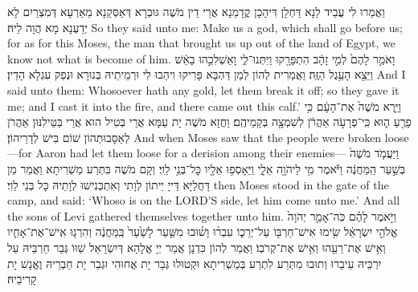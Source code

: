 {{וַאֲמַרוּ לִי עֲבֵיד לַנָא דַּחְלָן דִּיהָכָן קֳדָמַנָא אֲרֵי דֵין מֹשֶׁה גּוּבְרָא דְּאַסְּקַנָא מֵאַרְעָא דְּמִצְרַיִם לָא יְדַעְנָא מָא הֲוָה לֵיהּ׃}
{So they said unto me: Make us a god, which shall go before us; for as for this Moses, the man that brought us up out of the land of Egypt, we know not what is become of him.}{}
{וָאֹמַ֤ר לָהֶם֙ לְמִ֣י זָהָ֔ב הִתְפָּרָ֖קוּ וַיִּתְּנוּ־לִ֑י וָאַשְׁלִכֵ֣הוּ בָאֵ֔שׁ וַיֵּצֵ֖א הָעֵ֥גֶל הַזֶּֽה׃
}
{וַאֲמַרִית לְהוֹן לְמַן דַּהְבָּא פָּרִיקוּ וִיהַבוּ לִי וּרְמֵיתֵיהּ בְּנוּרָא וּנְפַק עִגְלָא הָדֵין׃}
{And I said unto them: Whosoever hath any gold, let them break it off; so they gave it me; and I cast it into the fire, and there came out this calf.’}{}
{וַיַּ֤רְא מֹשֶׁה֙ אֶת־הָעָ֔ם כִּ֥י פָרֻ֖עַ ה֑וּא כִּֽי־פְרָעֹ֣ה אַהֲרֹ֔ן לְשִׁמְצָ֖ה בְּקָמֵיהֶֽם׃
}
{וַחֲזָא מֹשֶׁה יָת עַמָּא אֲרֵי בְּטִיל הוּא אֲרֵי בַּטֵּילִנּוּן אַהֲרֹן לְאַסָּבוּתְהוֹן שׁוֹם בִּישׁ לְדָרֵיהוֹן׃}
{And when Moses saw that the people were broken loose—for Aaron had let them loose for a derision among their enemies—}{}
{וַיַּעֲמֹ֤ד מֹשֶׁה֙ בְּשַׁ֣עַר הַֽמַּחֲנֶ֔ה וַיֹּ֕אמֶר מִ֥י לַיהֹוָ֖ה אֵלָ֑י וַיֵּאָסְפ֥וּ אֵלָ֖יו כׇּל־בְּנֵ֥י לֵוִֽי׃
}
{וְקָם מֹשֶׁה בִּתְרַע מַשְׁרִיתָא וַאֲמַר מַן דָּחֲלַיָּא דַּייָ יֵיתוֹן לְוָתִי וְאִתְכְּנִישׁוּ לְוָתֵיהּ כָּל בְּנֵי לֵוִי׃}
{then Moses stood in the gate of the camp, and said: ‘Whoso is on the LORD’S side, let him come unto me.’ And all the sons of Levi gathered themselves together unto him.}{}
{וַיֹּ֣אמֶר לָהֶ֗ם כֹּֽה־אָמַ֤ר יְהֹוָה֙ אֱלֹהֵ֣י יִשְׂרָאֵ֔ל שִׂ֥ימוּ אִישׁ־חַרְבּ֖וֹ עַל־יְרֵכ֑וֹ עִבְר֨וּ וָשׁ֜וּבוּ מִשַּׁ֤עַר לָשַׁ֙עַר֙ בַּֽמַּחֲנֶ֔ה וְהִרְג֧וּ אִֽישׁ־אֶת־אָחִ֛יו וְאִ֥ישׁ אֶת־רֵעֵ֖הוּ וְאִ֥ישׁ אֶת־קְרֹבֽוֹ׃
}
{וַאֲמַר לְהוֹן כִּדְנָן אֲמַר יְיָ אֱלָהָא דְּיִשְׂרָאֵל שַׁוּוֹ גְּבַר חַרְבֵּיהּ עַל יִרְכֵּיהּ עֵיבַרוּ וְתוּבוּ מִתְּרַע לִתְרַע בְּמַשְׁרִיתָא וּקְטוּלוּ גְּבַר יָת אֲחוּהִי וּגְבַר יָת חַבְרֵיהּ וֶאֱנָשׁ יָת קָרִיבֵיהּ׃}
}
